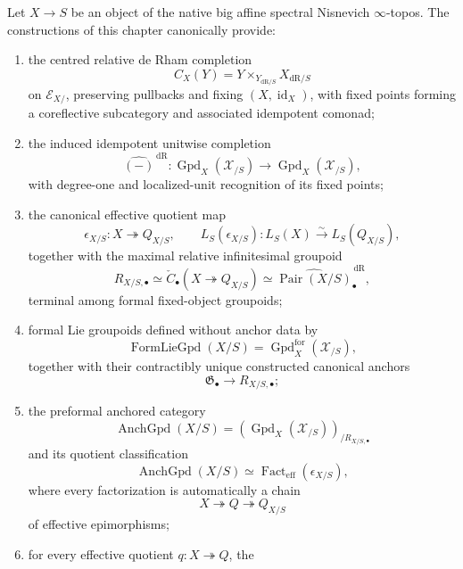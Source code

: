 \begin{theorem}
\label{thm:formal-lie-groupoid-package}
Let $X\to S$ be an object of the native big affine spectral Nisnevich
$\infty$-topos.  The constructions of this chapter canonically provide:
\begin{enumerate}
    \item the centred relative de Rham completion
    \[
        C_X(Y)
        =
        Y\times_{Y_{\mathrm{dR}/S}}X_{\mathrm{dR}/S}
    \]
    on $\mathcal E_{X/}$, preserving pullbacks and fixing
    $(X,\operatorname{id}_X)$, with fixed points forming a coreflective
    subcategory and associated idempotent comonad;
    \item the induced idempotent unitwise completion
    \[
        \widehat{(-)}^{\,\mathrm{dR}}:
        \operatorname{Gpd}_X(\mathcal X_{/S})
        \longrightarrow
        \operatorname{Gpd}_X(\mathcal X_{/S}),
    \]
    with degree-one and localized-unit recognition of its fixed points;
    \item the canonical effective quotient map
    \[
        \epsilon_{X/S}:X\twoheadrightarrow Q_{X/S},
        \qquad
        L_S(\epsilon_{X/S}):
        L_S(X)\xrightarrow{\sim}L_S(Q_{X/S}),
    \]
    together with the maximal relative infinitesimal groupoid
    \[
        R_{X/S,\bullet}
        \simeq
        \check C_\bullet
        \left(
            X\twoheadrightarrow Q_{X/S}
        \right)
        \simeq
        \widehat{\operatorname{Pair}(X/S)}^{\,\mathrm{dR}}_\bullet,
    \]
    terminal among formal fixed-object groupoids;
    \item formal Lie groupoids defined without anchor data by
    \[
        \operatorname{FormLieGpd}(X/S)
        =
        \operatorname{Gpd}^{\mathrm{for}}_X(\mathcal X_{/S}),
    \]
    together with their contractibly unique constructed canonical anchors
    \[
        \mathfrak G_\bullet\longrightarrow R_{X/S,\bullet};
    \]
    \item the preformal anchored category
    \[
        \operatorname{AnchGpd}(X/S)
        =
        \left(
            \operatorname{Gpd}_X(\mathcal X_{/S})
        \right)_{/R_{X/S,\bullet}}
    \]
    and its quotient classification
    \[
        \operatorname{AnchGpd}(X/S)
        \simeq
        \operatorname{Fact}_{\mathrm{eff}}(\epsilon_{X/S}),
    \]
    where every factorization is automatically a chain
    \[
        X\twoheadrightarrow Q\twoheadrightarrow Q_{X/S}
    \]
    of effective epimorphisms;
    \item for every effective quotient $q:X\twoheadrightarrow Q$, the

\end{enumerate}
\end{theorem}
